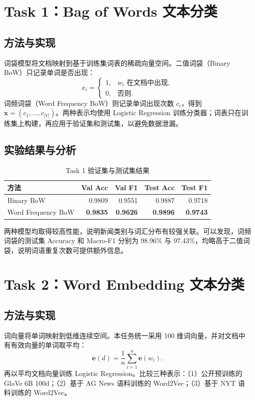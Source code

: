 \documentclass[UTF8,a4paper,11pt]{ctexart}
\begin{document}
\section{Task 1：Bag of Words 文本分类}
\subsection{方法与实现}
词袋模型将文档映射到基于训练集词表的稀疏向量空间。二值词袋（Binary BoW）只记录单词是否出现：
\begin{equation}x_i=\begin{cases}1,&w_i\text{ 在文档中出现},\\0,&\text{否则}.\end{cases}\end{equation}
词频词袋（Word Frequency BoW）则记录单词出现次数 $c_i$，得到 $\mathbf{x}=(c_1,\ldots,c_{|V|})$。两种表示均使用 Logistic Regression 训练分类器；词表只在训练集上构建，再应用于验证集和测试集，以避免数据泄漏。
\subsection{实验结果与分析}
\begin{table}[H]\centering\caption{Task 1 验证集与测试集结果}\small\begin{tabular}{lrrrr}\toprule 方法 & Val Acc & Val F1 & Test Acc & Test F1\\\midrule Binary BoW & 0.9809 & 0.9551 & 0.9887 & 0.9718\\Word Frequency BoW & \textbf{0.9835} & \textbf{0.9626} & \textbf{0.9896} & \textbf{0.9743}\\\bottomrule\end{tabular}\end{table}
两种模型均取得较高性能，说明新闻类别与词汇分布有较强关联。可以发现，词频词袋的测试集 Accuracy 和 Macro-F1 分别为 98.96\% 与 97.43\%，均略高于二值词袋，说明词语重复次数可提供额外信息。

\section{Task 2：Word Embedding 文本分类}
\subsection{方法与实现}
词向量将单词映射到低维连续空间。本任务统一采用 100 维词向量，并对文档中有有效向量的单词取平均：
\begin{equation}\mathbf{e}(d)=\frac{1}{n}\sum_{i=1}^{n}\mathbf{e}(w_i).\end{equation}
再以平均文档向量训练 Logistic Regression。比较三种表示：（1）公开预训练的 GloVe 6B 100d；（2）基于 AG News 语料训练的 Word2Vec；（3）基于 NYT 语料训练的 Word2Vec。
\end{document}
